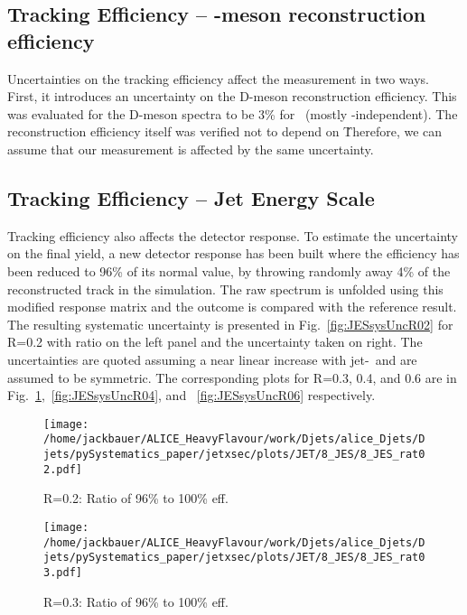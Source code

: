 \subsection{Tracking Efficiency -- \Dzero-meson reconstruction efficiency}\label{subsec:trackeffD}

Uncertainties on the tracking efficiency affect the measurement in two ways. 
First, it introduces an uncertainty on the D-meson reconstruction efficiency. This was evaluated for the D-meson spectra to be 3\% for \Dzero\ (mostly \pt-independent). The reconstruction efficiency itself was verified not to depend on \ptchjet\. Therefore, we can assume that our measurement is affected by the same uncertainty.

\subsection{Tracking Efficiency -- Jet Energy Scale}\label{subsec:trackeffJES}

Tracking efficiency also affects the detector response. To estimate the uncertainty on the final yield, a new detector response has been built where the efficiency has been reduced to 96\% of its normal value, by throwing randomly away 4\% of the reconstructed track in the simulation.
The raw spectrum is unfolded using this modified response matrix and the outcome is compared with the reference result. The resulting systematic uncertainty is presented in Fig.~\ref{fig:JESsysUncR02} for R=0.2 with ratio on the left panel and the uncertainty taken on right. The uncertainties are quoted assuming a near linear increase with jet-\pt\, and are assumed to be symmetric. The corresponding plots for R=0.3, 0.4, and 0.6 are in Fig.~\ref{fig:JESsysUncR03},~\ref{fig:JESsysUncR04}, and ~\ref{fig:JESsysUncR06} respectively.


\begin{figure}
\centering
\begin{minipage}{.5\textwidth}
  \centering
  \texttt{[image: /home/jackbauer/ALICE\_HeavyFlavour/work/Djets/alice\_Djets/Djets/pySystematics\_paper/jetxsec/plots/JET/8\_JES/8\_JES\_rat02.pdf]}
  \caption{R=0.2: Ratio of 96\% to 100\% eff.}
  \label{fig:JESsysUncR02}
\end{minipage}%
\begin{minipage}{.5\textwidth}
  \centering
  \texttt{[image: /home/jackbauer/ALICE\_HeavyFlavour/work/Djets/alice\_Djets/Djets/pySystematics\_paper/jetxsec/plots/JET/8\_JES/8\_JES\_rat03.pdf]}
  \caption{R=0.3: Ratio of 96\% to 100\% eff.}
  \label{fig:JESsysUncR03}
\end{minipage}
\end{figure}

